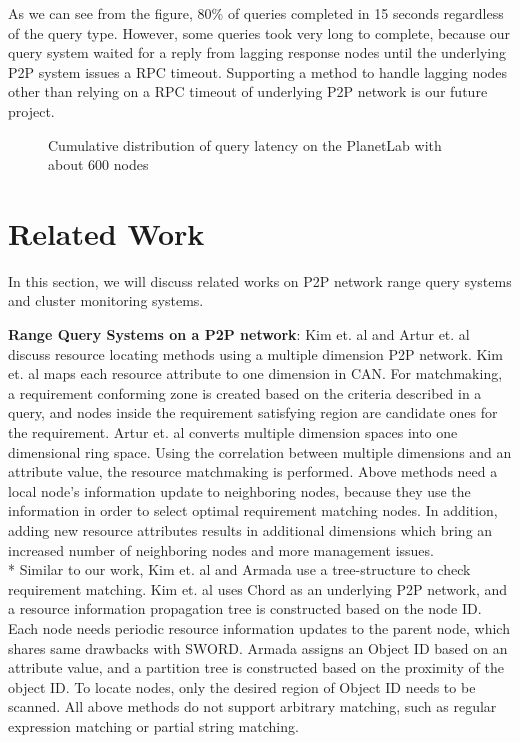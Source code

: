 \documentclass{acm_proc_article-sp}
\begin{document}
As we can see from the figure, 80\% of queries completed in 15 seconds regardless of the query type. However, some queries took very long to complete, 
because our query system waited for a reply from lagging response nodes until the underlying P2P system issues a RPC timeout.
Supporting a method to handle lagging nodes other than relying on a RPC timeout of underlying P2P network is our future project.
\begin{figure}
\centering
{}
\caption{\label{fig:plab}Cumulative distribution of query latency on the PlanetLab with about 600 nodes}
\end{figure}
\section{Related Work}
In this section, we will discuss related works on P2P network range query systems and cluster monitoring systems.

\textbf{Range Query Systems on a P2P network}: Kim et. al\cite{can_query} and Artur et. al\cite{query_for_grid} discuss resource locating methods using a multiple dimension P2P network. 
Kim et. al\cite{can_query} maps each resource attribute to one dimension in CAN\cite{can}. For matchmaking, a requirement conforming zone is created based on the criteria described in a query, 
and nodes inside the requirement satisfying region are candidate ones for the requirement.
Artur et. al\cite{query_for_grid} converts multiple dimension spaces into one dimensional ring space. Using the correlation between multiple dimensions and an attribute value, 
the resource matchmaking is performed. 
Above methods need a local node's information update to neighboring nodes, because they use the information in order to select optimal requirement matching nodes.  
In addition, adding new resource attributes results in additional dimensions which bring an increased number of neighboring nodes and more management issues.\\*
Similar to our work, Kim et. al\cite{chord_matching} and Armada\cite{armada} use a tree-structure to check requirement matching. 
Kim et. al\cite{chord_matching} uses Chord\cite{chord} as an underlying P2P network, and a resource information propagation tree is
constructed based on the node ID. Each node needs periodic resource information updates to the parent node, which shares same drawbacks with SWORD.
Armada\cite{armada} assigns an Object ID based on an attribute value, and a partition tree is constructed based on the proximity of the object ID. 
To locate nodes, only the desired region of Object ID needs to be scanned. All above methods do not support arbitrary matching, such as regular expression matching or partial string matching.
\end{document}
